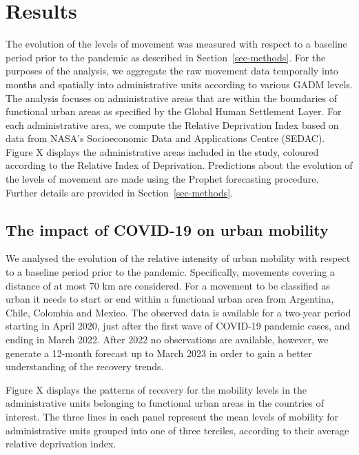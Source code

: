 \documentclass[
  11pt,
]{article}
\begin{document}
\hypertarget{sec-results}{%
\section{Results}\label{sec-results}}

The evolution of the levels of movement was measured with respect to a
baseline period prior to the pandemic as described in
Section~\ref{sec-methods}. For the purposes of the analysis, we
aggregate the raw movement data temporally into months and spatially
into administrative units according to various GADM levels. The analysis
focuses on administrative areas that are within the boundaries of
functional urban areas as specified by the Global Human Settlement
Layer. For each administrative area, we compute the Relative Deprivation
Index based on data from NASA's Socioeconomic Data and Applications
Centre (SEDAC). Figure X displays the administrative areas included in
the study, coloured according to the Relative Index of Deprivation.
Predictions about the evolution of the levels of movement are made using
the Prophet forecasting procedure. Further details are provided in
Section~\ref{sec-methods}.

\hypertarget{the-impact-of-covid-19-on-urban-mobility}{%
\subsection{The impact of COVID-19 on urban
mobility}\label{the-impact-of-covid-19-on-urban-mobility}}

We analysed the evolution of the relative intensity of urban mobility
with respect to a baseline period prior to the pandemic. Specifically,
movements covering a distance of at most 70 km are considered. For a
movement to be classified as urban it needs to start or end within a
functional urban area from Argentina, Chile, Colombia and Mexico. The
observed data is available for a two-year period starting in April 2020,
just after the first wave of COVID-19 pandemic cases, and ending in
March 2022. After 2022 no observations are available, however, we
generate a 12-month forecast up to March 2023 in order to gain a better
understanding of the recovery trends.

Figure X displays the patterns of recovery for the mobility levels in
the administrative units belonging to functional urban areas in the
countries of interest. The three lines in each panel represent the mean
levels of mobility for administrative units grouped into one of three
terciles, according to their average relative deprivation index.
\end{document}
